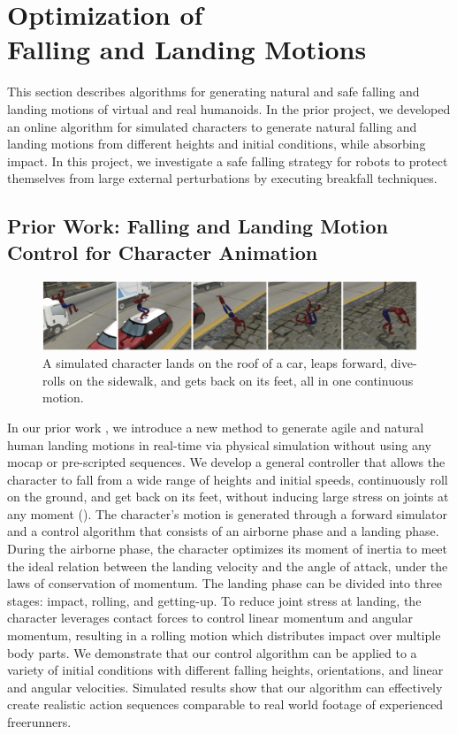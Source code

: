 \chapter{Optimization of \protect\\ Falling and Landing Motions}

\indent

This section describes algorithms for generating natural and safe
falling and landing motions of virtual and real humanoids.
In the prior project, we developed an online algorithm for simulated 
characters to generate natural falling and landing motions from 
different heights and initial conditions, while absorbing impact.
In this project, we investigate a safe falling 
strategy for robots to protect themselves from large external 
perturbations by executing breakfall techniques.

\section{Prior Work: Falling and Landing Motion Control for Character Animation}

\begin{figure}[htbp]
\center
  \includegraphics[width=\linewidth]{images/falling1_teaser}
  \caption{A simulated character lands on the roof of a car, 
    leaps forward, dive-rolls on the sidewalk, 
    and gets back on its feet, all in one continuous motion.}
 \label{fig:landingOverview}
\end{figure}

In our prior work \cite{Ha:2012:FAL}, 
we introduce a new method to generate agile and natural human landing
motions in real-time via physical simulation without using any mocap
or pre-scripted sequences. We develop a general controller that allows
the character to fall from a wide range of heights and initial speeds,
continuously roll on the ground, and get back on its feet, without
inducing large stress on joints at any moment 
().
The character's motion
is generated through a forward simulator and a control algorithm that
consists of an airborne phase and a landing phase. During the airborne
phase, the character optimizes its moment of inertia to meet the ideal
relation between the landing velocity and the angle of attack, under
the laws of conservation of momentum. The landing phase can be divided
into three stages: impact, rolling, and getting-up. To reduce joint
stress at landing, the character leverages contact forces to control
linear momentum and angular momentum, resulting in a rolling motion
which distributes impact over multiple body parts. We demonstrate that
our control algorithm can be applied to a variety of initial
conditions with different falling heights, orientations, and linear
and angular velocities. Simulated results show that our algorithm can
effectively create realistic action sequences comparable to real world
footage of experienced freerunners.


